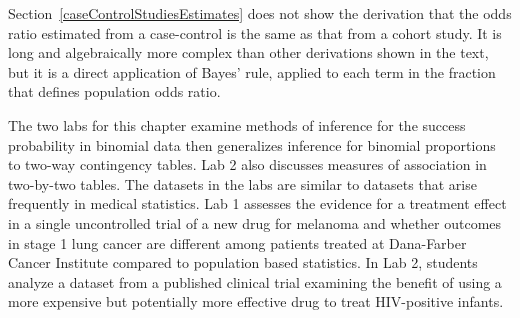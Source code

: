 Section~\ref{caseControlStudiesEstimates} does not show the derivation that the odds ratio estimated from a case-control is the same as that from a cohort study. It is long and algebraically more complex than other derivations shown in the text, but it is a direct application of Bayes' rule, applied to each term in the fraction that defines population odds ratio.

The two labs for this chapter examine methods of inference for the success probability in binomial data then generalizes inference for binomial proportions to two-way contingency tables.  Lab 2 also discusses measures of association in two-by-two tables.  The datasets in the labs are similar to datasets that arise frequently in medical statistics.  Lab 1 assesses the evidence for a treatment effect in a single uncontrolled trial of a new drug for melanoma and whether outcomes in stage 1 lung cancer are different among patients treated at Dana-Farber Cancer Institute compared to population based statistics. In Lab 2, students analyze a dataset from a published clinical trial examining the benefit of using a more expensive but potentially more effective drug to treat HIV-positive infants.

